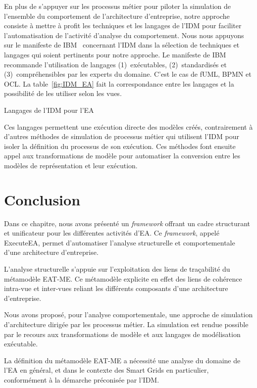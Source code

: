 En plus de s'appuyer sur les processus métier pour piloter la simulation de
l'ensemble du comportement de l'architecture d'entreprise, notre approche
consiste à mettre à profit les techniques et les langages de l'IDM pour
faciliter l'automatisation de l'activité d'analyse du comportement. Nous nous
appuyons sur le manifeste de IBM~\cite{chesbrough2006research} concernant l'IDM
dans la sélection de techniques et langages qui soient pertinents pour notre
approche. Le manifeste de IBM recommande l'utilisation de langages
(1)~exécutables, (2)~standardisés et (3)~compréhensibles par les experts du
domaine. C'est le cas de fUML, BPMN et OCL. La table~\ref{fig:IDM_EA} fait la
correspondance entre les langages et la possibilité de les utiliser selon les
vues.

\begin{table}[!ht]
    \centering
    
    \caption{Langages de l'IDM pour l'EA}
    \label{fig:IDM_EA}
\end{table}


Ces langages permettent une exécution directe des modèles créés, contrairement à
d'autres méthodes de simulation de processus métier qui utilisent l'IDM pour
isoler la définition du processus de son exécution. Ces méthodes font ensuite
appel aux transformations de modèle pour automatiser la conversion entre les
modèles de représentation et leur exécution.

\section{Conclusion}

Dans ce chapitre, nous avons présenté un \emph{framework} offrant un cadre structurant et unificateur 
pour les différentes activités d'EA. Ce \emph{framework}, appelé ExecuteEA, permet d'automatiser
l'analyse structurelle et comportementale d'une architecture d'entreprise. 

L'analyse structurelle
s'appuie sur l'exploitation des liens de traçabilité du métamodèle EAT-ME. Ce métamodèle
explicite en effet des liens de cohérence intra-vue et inter-vues reliant les différents composants
d'une architecture d'entreprise. 

Nous avons proposé, pour l'analyse comportementale, une approche
de simulation d'architecture dirigée par les processus métier. La simulation est rendue possible par
le recours aux transformations de modèle et aux langages de modélisation exécutable.

La définition du métamodèle EAT-ME a nécessité une analyse du domaine de l'EA en général, et dans le
contexte des Smart Grids en particulier, conformément à la démarche préconisée par l'IDM.  

